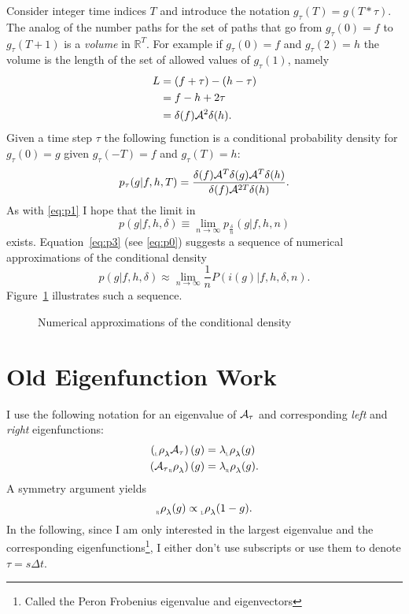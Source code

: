 \documentclass[12pt]{article} \usepackage{amsmath,amsfonts}
\newcommand{\Aop}{{\cal A}}
\newcommand{\rightfunction}{{_{_{\scalebox{.4}{R}}} \rho}}
\newcommand{\leftfunction}{{_{_{\scalebox{.4}{L}}} \rho}}
\newcommand{\field}[1]{\mathbb{#1}}
\newcommand\REAL{\field{R}}
\begin{document}
Consider integer time indices $T$ and introduce the notation
$g_\tau(T)= g(T*\tau)$.  The analog of the number paths for the set of
paths that go from $g_\tau(0)=f$ to $g_\tau(T+1)$ is a \emph{volume}
in $\REAL^T$.  For example if $g_\tau(0) = f$ and $g_\tau(2) = h$ the
volume is the length of the set of allowed values of $g_\tau(1)$,
namely
\begin{align*}
  L &= (f+\tau) - (h-\tau) \\
  &= f-h+2\tau \\
  &= \delta(f) \Aop^2 \delta(h).
\end{align*}
Given a time step $\tau$ the following function is a conditional
probability density for $g_\tau(0)=g$ given $g_\tau(-T)=f$ and
$g_\tau(T)=h$:
\begin{equation*}
  p_\tau(g|f,h,T) = \frac{\delta(f) \Aop^T \delta(g) \Aop^T \delta(h)}
  {\delta(f) \Aop^{2T} \delta(h)}. 
\end{equation*}
As with \eqref{eq:p1} I hope that the limit in
\begin{equation}
  \label{eq:p2}
  p(g|f,h,\delta) \equiv \lim_{n\rightarrow\infty}
  p_{\frac{\delta}{n}} (g|f,h,n)
\end{equation}
exists.  Equation~\eqref{eq:p3} (see \eqref{eq:p0}) suggests a
sequence of numerical approximations of the conditional density
\begin{equation}
  \label{eq:p3}
  p(g|f,h,\delta) \approx \lim_{n \rightarrow \infty} \frac{1}{n}
  P(i(g)|f,h,\delta, n).
\end{equation}
Figure~\ref{fig:foo} illustrates such a sequence.
\begin{figure}
  \centering
  \caption{Numerical approximations of the conditional density}
  \label{fig:foo}
\end{figure}

\section{Old Eigenfunction Work}

I use the following notation for an eigenvalue of $\Aop_\tau$ and
corresponding \emph{left} and \emph{right} eigenfunctions:
\begin{align*}
 \left( \leftfunction_\lambda \Aop_\tau \right)(g) &= \lambda
 \leftfunction_\lambda (g)\\
 \left(\Aop_\tau  \rightfunction_\lambda \right)(g) &= \lambda
 \rightfunction_\lambda (g).
\end{align*}
A symmetry argument yields
\begin{equation}
  \label{eq:symmetry}
  \rightfunction_\lambda(g) \propto \leftfunction_\lambda(1-g).
\end{equation}
In the following, since I am only interested in the largest
eigenvalue and the corresponding eigenfunctions\footnote{Called
  the Peron Frobenius eigenvalue and eigenvectors}, I either don't use
subscripts or use them to denote $\tau=s\Delta t$.
\end{document}
